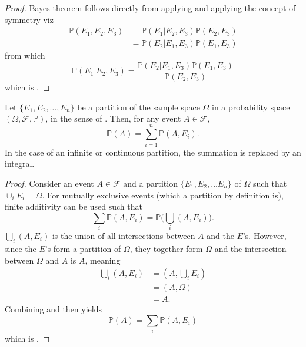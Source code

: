 \begin{proof}
	Bayes theorem follows directly from applying  and applying the concept of symmetry viz
	\begin{equation}
		\begin{split}
			\mathbb{P}(E_1,E_2,E_3) &= \mathbb{P}(E_1| E_2,E_3)\mathbb{P}(E_2,E_3) \\
			& = \mathbb{P}(E_2|E_1,E_3)\mathbb{P}(E_1,E_3)
		\end{split}
		\label{eq:c2}
	\end{equation}
	from which
	\begin{equation}
		\mathbb{P}(E_1| E_2,E_3) = \frac{\mathbb{P}(E_2| E_1,E_3)\mathbb{P}(E_1,E_3)}{\mathbb{P}(E_2,E_3)}
	\end{equation}
	which is .
\end{proof}

\begin{theorem}
	\label{theorem:law_of_total_probability}
	Let $\{E_1, E_2, \dots, E_n\}$ be a partition of the sample space $\Omega$ in a probability space $(\Omega, \mathcal{F}, \mathbb{P})$, in the sense of . Then, for any event $A \in \mathcal{F}$,
	\begin{equation}
		\mathbb{P}(A) = \sum_{i=1}^n \mathbb{P}(A, E_i).
		\label{eq:law_total_probability}
	\end{equation}
	In the case of an infinite or continuous partition, the summation is replaced by an integral.
\end{theorem}

\begin{proof}
	Consider an event $A\in \mathcal{F}$ and a partition $\{E_1,E_2,\dots E_n\}$ of $\Omega$ such that $\cup_{i}E_i=\Omega$. For mutually exclusive events (which a partition by definition is), finite additivity can be used such that
	\begin{equation}
		\sum_{i}\mathbb{P}(A,E_i) = \mathbb{P}\bigg(\bigcup_{i}(A,E_i)\bigg).
		\label{eq:qq1}
	\end{equation} 
	$\bigcup_{i}(A,E_i)$ is the union of all intersections between $A$ and the $E$'s. However, since the $E$'s form a partition of $\Omega$, they together form $\Omega$ and the intersection between $\Omega$ and $A$ is $A$, meaning
	\begin{equation}
		\begin{split}
			\bigcup_{i}(A,E_i)  &= (A,\bigcup_{i}E_i)\\
			&= (A,\Omega)\\
			& =A.
		\end{split}
	\label{eq:qq2}
	\end{equation}
	Combining  and  then yields
	\begin{equation}
		\mathbb{P}(A) = \sum_{i} \mathbb{P}(A, E_i)
	\end{equation}
	which is .
\end{proof}

